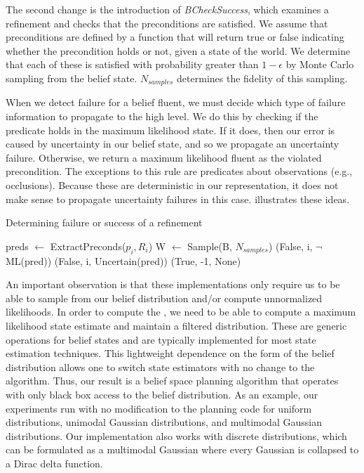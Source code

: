 The second change is the introduction of \emph{BCheckSuccess}, which examines a refinement and
checks that the preconditions
are satisfied. We assume that preconditions are defined by a function
that will return true or false indicating whether the precondition holds or not,
given a state of the world. We determine
that each of these is satisfied with probability greater than
$1-\epsilon$ by Monte Carlo sampling from the belief
state. $N_{samples}$ determines the fidelity of this sampling.

When we detect failure for a belief fluent, we must decide which type
of failure information to propagate to the high level. We do this by
checking if the predicate holds in the maximum likelihood state. If it
does, then our error is caused by uncertainty in our belief state, and so
we propagate an uncertainty failure. Otherwise, we return a maximum
likelihood fluent as the violated precondition. The exceptions to this
rule are predicates about observations (e.g., occlusions). Because
these are deterministic in our representation, it does not make sense
to propagate uncertainty failures in this case. 
illustrates these ideas.


\begin{algorithm}
 \caption{Determining failure or success of a refinement} \label{alg-bcheck}
 \begin{algorithmic}[1]
          \State preds $\leftarrow $ ExtractPreconds($p_i, R_i$)
          \State W $\leftarrow$ Sample(B, $N_{samples}$)
                     \State \Return (False, i, $\lnot$ML(pred))
                 \Else
                     \State \Return (False, i, Uncertain(pred))
                 \EndIf
              \EndIf
          \EndFor
      \EndFor
      \State \Return (True, -1, None)
  \EndProcedure
 \end{algorithmic}
\end{algorithm}
An important observation is that these implementations only require
us to be able to sample from our belief distribution and/or compute
unnormalized likelihoods. In order to compute the \mld{}, we need to be
able to compute a maximum likelihood state estimate and maintain a
filtered distribution. These are generic operations for belief states
and are typically implemented for most state estimation
techniques. This lightweight dependence on the form of the belief
distribution allows one to switch state estimators with no
change to the algorithm. Thus, our result is a belief space planning
algorithm that operates with only black box access to the belief
distribution. As an example, our experiments run with no modification
to the planning code for uniform distributions, unimodal Gaussian
distributions, and multimodal Gaussian distributions. Our implementation also works with discrete distributions, which can be formulated as a multimodal Gaussian where every Gaussian is collapsed to a Dirac delta function.

